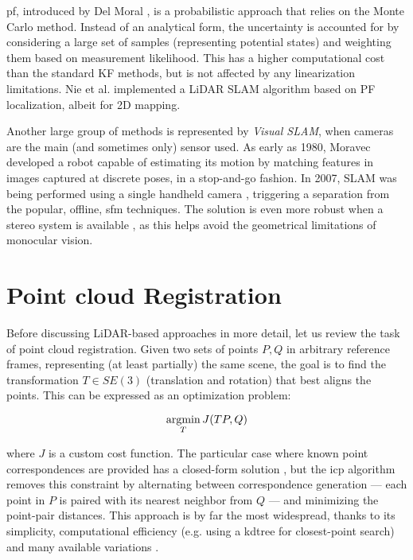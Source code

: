\acrfull{pf}, introduced by Del Moral \cite{del1997nonlinear}, is a probabilistic approach that relies on the Monte Carlo method. Instead of an analytical form, the uncertainty is accounted for by considering a large set of samples (representing potential states) and weighting them based on measurement likelihood. This has a higher computational cost than the standard KF methods, but is not affected by any linearization limitations. Nie et al. \cite{lcpf2020} implemented a LiDAR SLAM algorithm based on PF localization, albeit for 2D mapping.

Another large group of methods is represented by \emph{Visual SLAM}, when cameras are the main (and sometimes only) sensor used. As early as 1980, Moravec \cite{moravec1980obstacle} developed a robot capable of estimating its motion by matching features in images captured at discrete poses, in a stop-and-go fashion. In 2007, SLAM was being performed using a single handheld camera \cite{davison2007monoslam} \cite{klein2007parallel}, triggering a separation from the popular, offline, \gls{sfm} techniques. The solution is even more robust when a stereo system is available \cite{mei2011rslam}, as this helps avoid the geometrical limitations of monocular vision.

\section{Point cloud Registration}

Before discussing LiDAR-based approaches in more detail, let us review the task of point cloud registration. Given two sets of points $P, Q$ in arbitrary reference frames, representing (at least partially) the same scene, the goal is to find the transformation $T \in SE(3) $ (translation and rotation) that best aligns the points. This can be expressed as an optimization problem:

\begin{equation}\notag
    \underset{T}{\operatorname{argmin}}\,J(TP, Q)
\end{equation}

where $J$ is a custom cost function. The particular case where known point correspondences are provided has a closed-form solution \cite{arun1987leastsquares}, but the \acrfull{icp} algorithm \cite{besl1992method} removes this constraint by alternating between correspondence generation --- each point in $P$ is paired with its nearest neighbor from $Q$ --- and minimizing the point-pair distances. This approach is by far the most widespread, thanks to its simplicity, computational efficiency (e.g. using a \gls{kdtree} for closest-point search) and many available variations \cite{rusinkiewicz2001efficient} \cite{huang2021comprehensivesurveypointcloud}.


